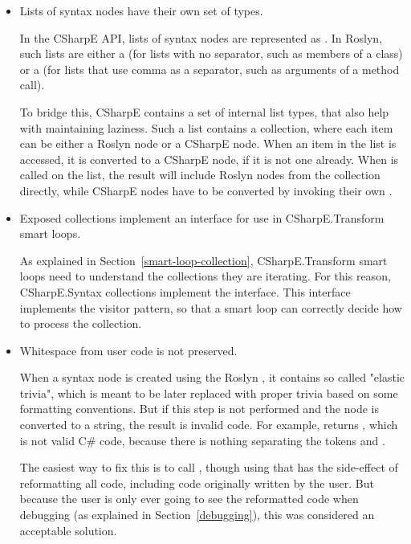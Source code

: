\begin{itemize}
\begin{enumerate}
\end{enumerate}

\item Lists of syntax nodes have their own set of types.

In the CSharpE \ac{API}, lists of syntax nodes are represented as . In Roslyn, such lists are either a  (for lists with no separator, such as members of a class) or a  (for lists that use comma as a separator, such as arguments of a method call).

To bridge this, CSharpE contains a set of internal list types, that also help with maintaining laziness. Such a list contains a collection, where each item can be either a Roslyn node or a CSharpE node. When an item in the list is accessed, it is converted to a CSharpE node, if it is not one already. When  is called on the list, the result will include Roslyn nodes from the collection directly, while CSharpE nodes have to be converted by invoking their own .

\item Exposed collections implement an interface for use in CSharpE.Transform smart loops.

As explained in Section~\ref{smart-loop-collection}, CSharpE.Transform smart loops need to understand the collections they are iterating. For this reason, CSharpE.Syntax collections implement the  interface. This interface implements the visitor pattern, so that a smart loop can correctly decide how to process the collection.

\item Whitespace from user code is not preserved.

When a syntax node is created using the Roslyn , it contains so called "elastic trivia", which is meant to be later replaced with proper trivia based on some formatting conventions. But if this step is not performed and the node is converted to a string, the result is invalid code. For example,  returns , which is not valid C\# code, because there is nothing separating the tokens  and .

The easiest way to fix this is to call , though using that has the side-effect of reformatting all code, including code originally written by the user. But because the user is only ever going to see the reformatted code when debugging (as explained in Section~\ref{debugging}), this was considered an acceptable solution.
\end{itemize}

